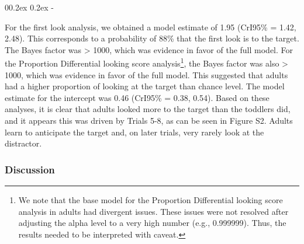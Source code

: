 \documentclass[
  man, donotrepeattitle,floatsintext]{apa6}
\makeatletter
\let\oldsubparagraph\subparagraph
\renewcommand{\subparagraph}{
    \@ifstar
      \xxxSubParagraphStar
      \xxxSubParagraphNoStar
  }
\newcommand{\xxxSubParagraphStar}[1]{\oldsubparagraph*{#1}\mbox{}}
\newcommand{\xxxSubParagraphNoStar}[1]{\oldsubparagraph{#1}\mbox{}}
\renewcommand{\subparagraph}[1]{\@startsection{subparagraph}{5}{1em}%
  {0\baselineskip \@plus 0.2ex \@minus 0.2ex}%
  {-\z@\relax}%
  {\normalfont\normalsize\itshape\hspace{\parindent}{#1}\textit{\addperi}}{\relax}}
\makeatother
\begin{document}
\subparagraph{Adults.}\label{adults.}

For the first look analysis, we obtained a model estimate of 1.95 (CrI95\% = 1.42, 2.48). This corresponds to a probability of 88\% that the first look is to the target. The Bayes factor was \textgreater{} 1000, which was evidence in favor of the full model. For the Proportion Differential looking score analysis\footnote{We note that the base model for the Proportion Differential looking score analysis in adults had divergent issues. These issues were not resolved after adjusting the alpha level to a very high number (e.g., 0.999999). Thus, the results needed to be interpreted with caveat.}, the Bayes factor was also \textgreater{} 1000, which was evidence in favor of the full model. This suggested that adults had a higher proportion of looking at the target than chance level. The model estimate for the intercept was 0.46 (CrI95\% = 0.38, 0.54). Based on these analyses, it is clear that adults looked more to the target than the toddlers did, and it appears this was driven by Trials 5-8, as can be seen in Figure S2. Adults learn to anticipate the target and, on later trials, very rarely look at the distractor.

\subsubsection{Discussion}\label{discussion}
\end{document}
